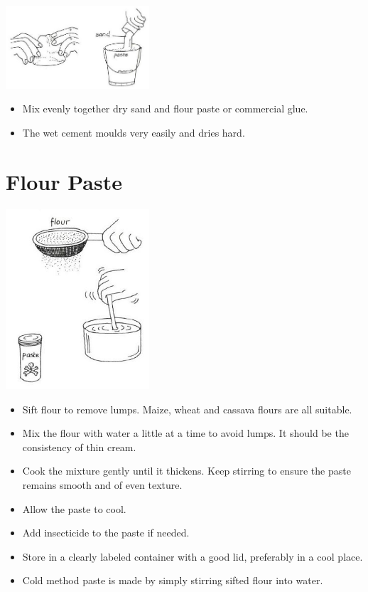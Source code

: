 \begin{multicols}{2}
\begin{center}
\includegraphics[width=0.4\textwidth]{./img/vso/cement.jpg}
\end{center}

\begin{itemize}
\item Mix evenly together dry sand
and flour paste
or commercial glue.
\item The wet cement moulds very
easily and dries hard.
\end{itemize}


\section{Flour Paste} %

\begin{center}
\includegraphics[width=0.4\textwidth]{./img/vso/dough.jpg}
\end{center}

\begin{itemize}
\item Sift flour to remove lumps. Maize, wheat and cassava flours are all
suitable.
\item Mix the flour with water a little at a time to avoid lumps. It should be
the consistency of thin cream.
\item Cook the mixture gently until it thickens. Keep stirring to ensure the
paste remains smooth and of even texture.
\item Allow the paste to cool.
\item Add insecticide to the paste if needed.
\item Store in a clearly labeled container with a good lid, preferably in a
cool place.
\item Cold method paste is made by simply stirring sifted flour into water.
\end{itemize}



\end{multicols}
